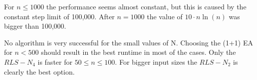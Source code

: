 

For $n\le1000$ the performance seems almost constant, but this is caused by the constant step limit of 100,000.
After $n=1000$ the value of $10 \cdot n \ln(n)$ was bigger than 100,000.



No algorithm is very successful for the small values of N.
Choosing the (1+1) EA for $n<500$ should result in the best runtime in most of the cases.
Only the $RLS-N_4$ is faster for $50\le n \le 100$.
For bigger input sizes the $RLS-N_2$ is clearly the best option.
